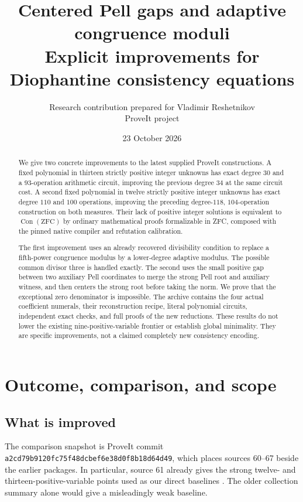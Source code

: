 \documentclass[11pt]{article}
\title{Centered Pell gaps and adaptive congruence moduli\\
\large Explicit improvements for Diophantine consistency equations}
\author{Research contribution prepared for Vladimir Reshetnikov\\
\small ProveIt project}
\date{23 October 2026}
\newcommand{\Con}{\operatorname{Con}}
\theoremstyle{remark}
\begin{document}
\maketitle
\begin{abstract}
We give two concrete improvements to the latest supplied ProveIt constructions.
A fixed polynomial in thirteen strictly positive integer unknowns has exact
degree $30$ and a $93$-operation arithmetic circuit, improving the previous
degree $34$ at the same circuit cost. A second fixed polynomial in twelve
strictly positive integer unknowns has exact degree $110$ and $100$ operations,
improving the preceding degree-$118$, $104$-operation construction on both
measures. Their lack of positive integer solutions is equivalent to
$\Con(\mathrm{ZFC})$ by ordinary mathematical proofs formalizable in ZFC,
composed with the pinned native compiler and refutation calibration.

The first improvement uses an already recovered divisibility condition to
replace a fifth-power congruence modulus by a lower-degree adaptive modulus.
The possible common divisor three is handled exactly. The second uses the
small positive gap between two auxiliary Pell coordinates to merge the
strong Pell root and auxiliary witness, and then centers the strong root
before taking the norm. We prove that the exceptional zero denominator is
impossible. The archive contains the four actual coefficient numerals, their
reconstruction recipe, literal polynomial circuits, independent exact checks,
and full proofs of the new reductions. These results do not lower the existing
nine-positive-variable frontier or establish global minimality. They are
specific improvements, not a claimed completely new consistency encoding.
\end{abstract}
\setcounter{tocdepth}{1}
\tableofcontents
\newpage

\section{Outcome, comparison, and scope}

\subsection{What is improved}

The comparison snapshot is ProveIt commit
\texttt{a2cd79b9120fc75f48dcbef6e38d0f8b18d64d49}, which places sources
60--67 beside the earlier packages. In particular, source 61 already gives
the strong twelve- and thirteen-positive-variable points used as our direct
baselines \cite{source61}. The older collection summary alone would give a
misleadingly weak baseline.
\end{document}
